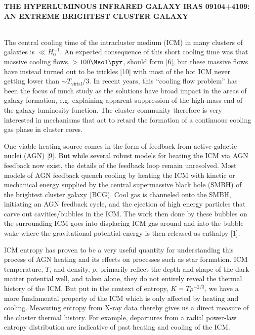 \documentclass[letterpaper,11pt,twocolumn]{article}
\begin{document}
\pagestyle{plain}

\begin{center}
\bfseries\uppercase{The Hyperluminous Infrared Galaxy IRAS 09104+4109: An Extreme Brightest Cluster Galaxy}
\end{center}

\\
The central cooling time of the intracluster medium (ICM) in many
clusters of galaxies is $\ll H_0^{-1}$. An expected consequence of
this short cooling time was that massive cooling flows, $> 100 \Msol
\pyr$, should form [6], but these massive
flows have instead turned out to be trickles [10] with
most of the hot ICM never getting lower than $\sim T_{\mathrm{virial}}/3$. In
recent years, this ``cooling flow problem'' has been the focus of much
study as the solutions have broad impact in the areas of
galaxy formation, e.g. explaining apparent suppression of the
high-mass end of the galaxy luminosity function. The cluster
community therefore is very interested in mechanisms that act to
retard the formation of a continuous cooling gas phase in cluster
cores.

One viable heating source comes in the form of feedback from active
galactic nuclei (AGN) [9]. But while several
robust models for heating the ICM via AGN feedback now exist, the
details of the feedback loop remain unresolved. Most models of AGN
feedback quench cooling by heating the ICM with kinetic or
mechanical energy supplied by the central supermassive black hole
(SMBH) of the brightest cluster galaxy (BCG). Cool gas is channeled
onto the SMBH, initiating an AGN feedback cycle, and the ejection
of high energy particles that carve out cavities/bubbles in the ICM. The
work then done by these bubbles on the surrounding ICM goes into
displacing ICM gas around and into the bubble wake where the
gravitational potential energy is then released as enthalpy
[1].

ICM entropy has proven to be a very useful quantity for understanding
this process of AGN heating and its effects on processes
such as star formation. ICM temperature, $T$, and density, $\rho$,
primarily reflect the depth and shape of the dark matter potential
well, and taken alone, they do not entirely reveal the thermal history
of the ICM. But put in the context of entropy, $K=T\rho^{-2/3}$, we have
a more fundamental property of the ICM which is only affected by
heating and cooling. Measuring entropy from X-ray data thereby gives
us a direct measure of the cluster thermal history. For example,
departures from a radial power-law entropy distribution are indicative
of past heating and cooling of the ICM.
\end{document}

